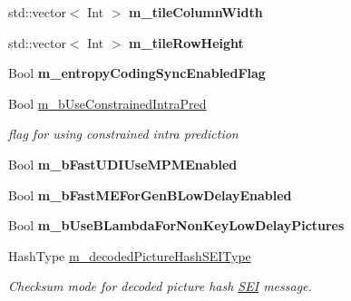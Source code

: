 \begin{DoxyCompactItemize}
\mbox{\label{class_t_app_enc_cfg_a6b02fb85818def495eab02a41ada588c}} 
std\+::vector$<$ Int $>$ {\bfseries m\+\_\+tile\+Column\+Width}
\item 
\mbox{\label{class_t_app_enc_cfg_a33fdda1586ebefc5c3a4bb921367396a}} 
std\+::vector$<$ Int $>$ {\bfseries m\+\_\+tile\+Row\+Height}
\item 
\mbox{\label{class_t_app_enc_cfg_a95a3aefbe290fc2803edff36335b4807}} 
Bool {\bfseries m\+\_\+entropy\+Coding\+Sync\+Enabled\+Flag}
\item 
\mbox{\label{class_t_app_enc_cfg_ae96713e1f42a7a3fe63bf5d45cf0d03b}} 
Bool \hyperlink{class_t_app_enc_cfg_ae96713e1f42a7a3fe63bf5d45cf0d03b}{m\+\_\+b\+Use\+Constrained\+Intra\+Pred}
\begin{DoxyCompactList}\small\item\em flag for using constrained intra prediction \end{DoxyCompactList}\item 
\mbox{\label{class_t_app_enc_cfg_a93840b0e25bf9b880835b3344af1032d}} 
Bool {\bfseries m\+\_\+b\+Fast\+U\+D\+I\+Use\+M\+P\+M\+Enabled}
\item 
\mbox{\label{class_t_app_enc_cfg_a92cd3caa27c4afbcc158d32417650a93}} 
Bool {\bfseries m\+\_\+b\+Fast\+M\+E\+For\+Gen\+B\+Low\+Delay\+Enabled}
\item 
\mbox{\label{class_t_app_enc_cfg_a225746d227220c64cff2b050d629eca7}} 
Bool {\bfseries m\+\_\+b\+Use\+B\+Lambda\+For\+Non\+Key\+Low\+Delay\+Pictures}
\item 
\mbox{\label{class_t_app_enc_cfg_a804cdc812b625fa3c98759e95f55a8df}} 
Hash\+Type \hyperlink{class_t_app_enc_cfg_a804cdc812b625fa3c98759e95f55a8df}{m\+\_\+decoded\+Picture\+Hash\+S\+E\+I\+Type}
\begin{DoxyCompactList}\small\item\em Checksum mode for decoded picture hash \hyperlink{class_s_e_i}{S\+EI} message. \end{DoxyCompactList}\item 
\mbox{\label{class_t_app_enc_cfg_a53f8568a25c0140d34c36c7a15ba73a0}} 

\end{DoxyCompactItemize}
